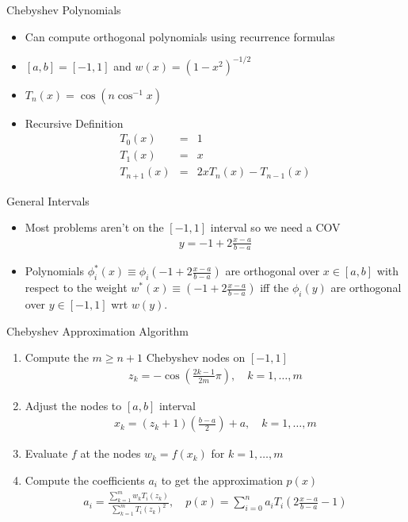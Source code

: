 \documentclass[11pt,handout,xcolor=pdftex,dvipsnames,table,mathserif,aspectratio=169]{beamer}
\begin{document}
\begin{frame}{Chebyshev Polynomials}
\small
\begin{itemize}
\item Can compute orthogonal polynomials using recurrence formulas
\item $[a,b] = [-1,1]$ and $w(x) = (1-x^2)^{-1/2}$
\item $T_n(x) = \cos(n \cos^{-1} x)$
\item Recursive Definition 
\begin{eqnarray*}
T_0(x) &=& 1\\
T_1(x) &=& x\\
T_{n+1}(x) &=& 2x T_n(x) - T_{n-1}(x)
\end{eqnarray*}
\end{itemize}
\begin{block}{General Intervals}
\begin{itemize}
\item Most problems aren't on the $[-1,1]$ interval so we need a COV
\begin{eqnarray*}
y = -1 + 2 \frac{x-a}{b-a}
\end{eqnarray*}
\item Polynomials $\phi_i^{*}(x) \equiv \phi_i (-1 + 2 \frac{x-a}{b-a})$ are orthogonal over $x \in[a,b]$ with respect to the weight $w^{*}(x) \equiv (-1 + 2 \frac{x-a}{b-a})$ iff the $\phi_i(y)$ are orthogonal over $y\in[-1,1]$ wrt $w(y)$.
\end{itemize} 
\end{block}
\end{frame}

\begin{frame}{Chebyshev Approximation Algorithm}
\small
\begin{enumerate}
\item Compute the $m \geq n+1$ Chebyshev nodes on $[-1,1]$
\begin{eqnarray*}
z_k = -\cos \left ( \frac{2k-1}{2m} \pi \right) , \quad k=1,\ldots,m
\end{eqnarray*}
\item Adjust the nodes to $[a,b]$ interval
\begin{eqnarray*}
x_k = (z_k + 1)\left(\frac{b-a}{2} \right) + a , \quad k=1,\ldots,m
\end{eqnarray*}
\item Evaluate $f$ at the nodes $w_k = f(x_k)$ for $ k=1,\ldots,m$
\item Compute the coefficients $a_i$ to get the approximation $p(x)$
\begin{eqnarray*}
a_i = \frac{\sum_{k=1}^m w_k T_i(z_k)}{\sum_{k=1}^m  T_i(z_k)^2}, \quad
p(x) = \sum_{i=0}^n a_i T_i \left( 2 \frac{x-a}{b-a} -1 \right) 
\end{eqnarray*}
\end{enumerate}
\end{frame}
\end{document}
